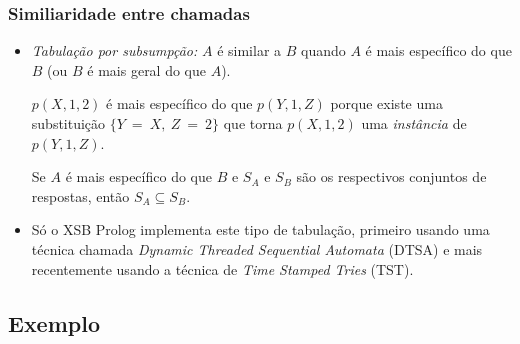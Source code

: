 \documentclass{beamer}
\begin{document}
\begin{frame}
   \frametitle{Similiaridade entre chamadas}
   \begin{itemize}
   \item \emph{Tabulação por subsumpção:} $A$ é similar a $B$ quando $A$ é mais específico do que $B$ (ou $B$ é mais geral do que $A$).
   \begin{example}
      $p(X,1,2)$ é mais específico do que $p(Y,1,Z)$ porque existe uma substituição $\{Y~=~X,~Z~=~2\}$
      que torna $p(X,1,2)$ uma \emph{instância} de $p(Y,1,Z)$.
   \end{example}
   \pause
   \begin{theorem}
      Se $A$ é mais específico do que $B$ e $S_A$ e $S_B$ são os respectivos conjuntos de respostas, então $S_A \subseteq S_B$.
   \end{theorem}
   \pause
   \item Só o XSB Prolog implementa este tipo de tabulação, primeiro usando uma técnica chamada \textit{Dynamic Threaded Sequential Automata} (DTSA) e mais recentemente usando a técnica de \textit{Time Stamped Tries} (TST).
\end{itemize}
\end{frame}

\subsection{Exemplo}
\end{document}
